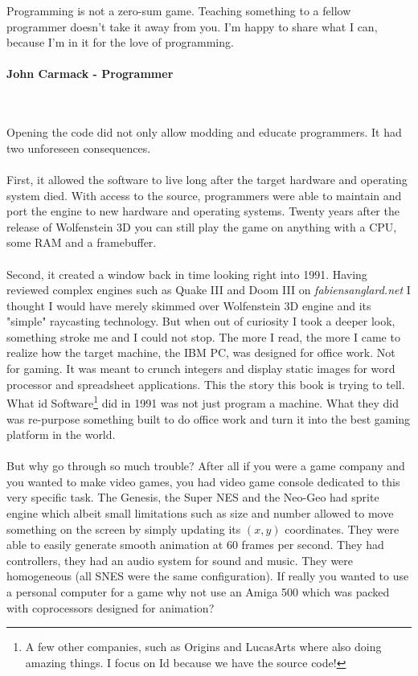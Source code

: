  \begin{fancyquotes}
   Programming is not a zero-sum game. Teaching something to a fellow programmer doesn't take it away from you. I'm happy to share what I can, because I'm in it for the love of programming.\\
   \\
\textbf{John Carmack - Programmer}
 \end{fancyquotes}\\
\\
Opening the code did not only allow modding and educate programmers. It had two unforeseen consequences.\\
\\
First, it allowed the software to live long after the target hardware and operating system died. With access to the source, programmers were able to maintain and port the engine to new hardware and operating systems. Twenty years after the release of Wolfenstein 3D you can still play the game on anything with a CPU, some RAM and a framebuffer. \\
\\
Second, it created a window back in time looking right into 1991. Having reviewed complex engines such as Quake III and Doom III on \emph{fabiensanglard.net} I thought I would have merely skimmed over Wolfenstein 3D engine and its "simple" raycasting technology. But when out of curiosity I took a deeper look, something stroke me and I could not stop. The more I read, the more I came to realize how the target machine, the IBM PC, was designed for office work. Not for gaming. It was meant to crunch integers and display static images for word processor and spreadsheet applications. This the story this book is trying to tell. What id Software\footnote{A few other companies, such as Origins and LucasArts where also doing amazing things. I focus on Id because we have the source code!} did in 1991 was not just program a machine. What they did was re-purpose something built to do office work and turn it into the best gaming platform in the world.\\
\\
But why go through so much trouble? After all if you were a game company and you wanted to make video games, you had video game console dedicated to this very specific task. The Genesis, the Super NES and the Neo-Geo had sprite engine which albeit small limitations such as size and number allowed to move something on the screen by simply updating its $(x,y)$ coordinates. They were able to easily generate smooth animation at 60 frames per second. They had controllers, they had an audio system for sound and music. They were homogeneous (all SNES were the same configuration). If really you wanted to use a personal computer for a game why not use an Amiga 500 which was packed with coprocessors designed for animation?\\
